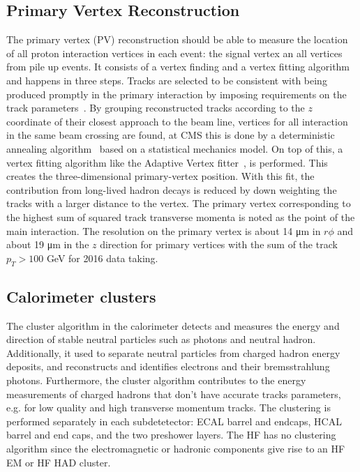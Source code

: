 \subsection{Primary Vertex Reconstruction}
The primary vertex (PV) reconstruction should be able to measure the location of all proton interaction vertices in each event: the signal vertex an all vertices from pile up events. 
It consists of a vertex finding and a vertex fitting algorithm and happens in three steps. Tracks are selected  to be consistent with being produced promptly in the primary interaction by imposing requirements on the track parameters~\cite{Chatrchyan:1704291}. By grouping reconstructed tracks according to the $z$ coordinate of their closest approach to the beam line, vertices for all interaction in the same beam crossing are found, at CMS this is done by a deterministic annealing algorithm~\cite{726788} based on a statistical mechanics model. On top of this, a vertex fitting algorithm like the Adaptive Vertex fitter~\cite{Waltenberger:1166320}, is performed. This creates the three-dimensional primary-vertex position. With this fit, the contribution from long-lived hadron decays is reduced by down weighting the tracks with a larger distance to the vertex. The primary vertex corresponding to the highest sum of squared track transverse momenta is noted as the point of the main interaction. The resolution on the primary vertex is about 14 \si{ \micro \meter} in $r\phi$ and about 19 \si{ \micro \meter} in the $z$ direction for primary vertices with the sum of the track $p_T > 100$ \si{ \GeV} for 2016 data taking.

\subsection{Calorimeter clusters}
The cluster algorithm in the calorimeter  detects and measures the energy and direction of stable neutral particles such as photons and neutral hadron. Additionally, it used to separate neutral particles from charged hadron energy deposits, 
and reconstructs and identifies electrons and their bremsstrahlung photons. Furthermore, the cluster algorithm contributes to the energy measurements of charged hadrons that don't have accurate tracks parameters, e.g. for low quality and high transverse momentum tracks. The clustering is performed separately in each subdetetector: ECAL barrel and endcaps, HCAL barrel and end caps, and the two preshower layers. The HF has no clustering algorithm since the electromagnetic or hadronic components give rise to an HF EM or HF HAD cluster. 

